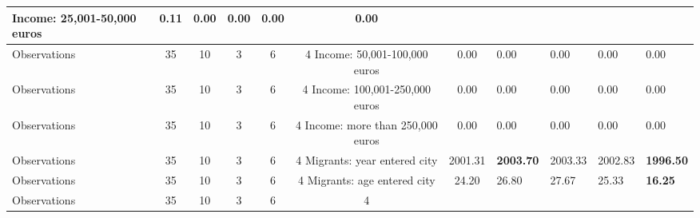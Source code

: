 \begin{tabular}{l c c c c c c }
Income: 25,001-50,000 euros &      0.11 & \textbf{     0.00} & \textbf{     0.00} & \textbf{     0.00} & \textbf{     0.00} \\
\midrule
Observations &        35 &        10 &         3 &         6 &         4
Income: 50,001-100,000 euros &      0.00 &      0.00 &      0.00 &      0.00 &      0.00 \\
\midrule
Observations &        35 &        10 &         3 &         6 &         4
Income: 100,001-250,000 euros &      0.00 &      0.00 &      0.00 &      0.00 &      0.00 \\
\midrule
Observations &        35 &        10 &         3 &         6 &         4
Income: more than 250,000 euros &      0.00 &      0.00 &      0.00 &      0.00 &      0.00 \\
\midrule
Observations &        35 &        10 &         3 &         6 &         4
Migrants: year entered city &   2001.31 & \textbf{  2003.70} &   2003.33 &   2002.83 & \textbf{  1996.50} \\
\midrule
Observations &        35 &        10 &         3 &         6 &         4
Migrants: age entered city &     24.20 &     26.80 &     27.67 &     25.33 & \textbf{    16.25} \\
\midrule
Observations &        35 &        10 &         3 &         6 &         4
\bottomrule
\end{tabular}
